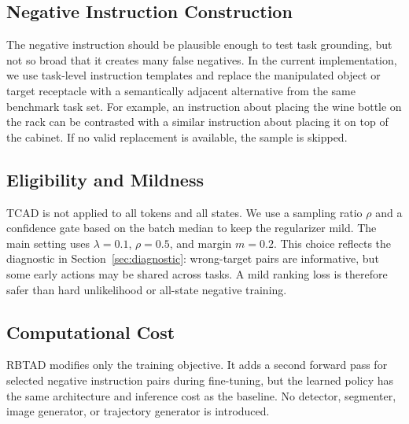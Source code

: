 \subsection{Negative Instruction Construction}

The negative instruction should be plausible enough to test task grounding, but not so broad that it creates many false negatives. In the current implementation, we use task-level instruction templates and replace the manipulated object or target receptacle with a semantically adjacent alternative from the same benchmark task set. For example, an instruction about placing the wine bottle on the rack can be contrasted with a similar instruction about placing it on top of the cabinet. If no valid replacement is available, the sample is skipped.

\subsection{Eligibility and Mildness}

TCAD is not applied to all tokens and all states. We use a sampling ratio $\rho$ and a confidence gate based on the batch median to keep the regularizer mild. The main \liberocorelt{} setting uses $\lambda=0.1$, $\rho=0.5$, and margin $m=0.2$. This choice reflects the diagnostic in Section~\ref{sec:diagnostic}: wrong-target pairs are informative, but some early actions may be shared across tasks. A mild ranking loss is therefore safer than hard unlikelihood or all-state negative training.

\subsection{Computational Cost}

RBTAD modifies only the training objective. It adds a second forward pass for selected negative instruction pairs during fine-tuning, but the learned policy has the same architecture and inference cost as the baseline. No detector, segmenter, image generator, or trajectory generator is introduced.

